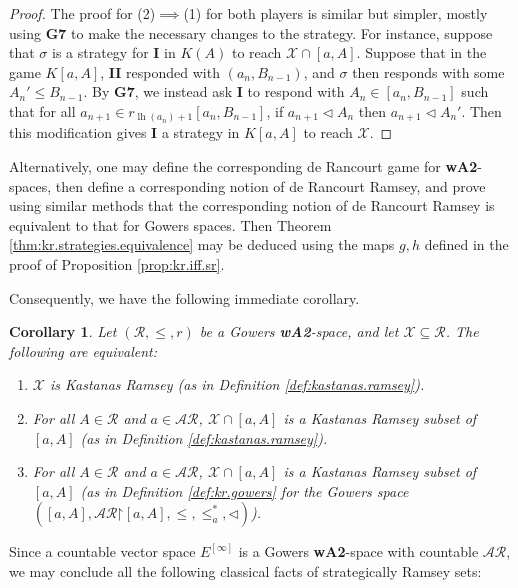 \documentclass[11pt,reqno]{amsart}
\theoremstyle{plain}
\numberwithin{equation}{section}
\newtheorem{corollary}[theorem]{Corollary}
\theoremstyle{definition}
\newcommand{\func}{\operatorname}
\newcommand{\cal}{\mathcal}
\newcommand{\restrictedto}{\mathord{\upharpoonright}}
\newcommand{\X}{\cal{X}}
\newcommand{\lh}{\func{lh}}
\begin{document}
\begin{proof}
     The proof for (2)$\implies$(1) for both players is similar but simpler, mostly using \textbf{G7} to make the necessary changes to the strategy. For instance, suppose that $\sigma$ is a strategy for \textbf{I} in $K(A)$ to reach $\X \cap [a,A]$. Suppose that in the game $K[a,A]$, \textbf{II} responded with $(a_n,B_{n-1})$, and $\sigma$ then responds with some $A_n' \leq B_{n-1}$. By \textbf{G7}, we instead ask \textbf{I} to respond with $A_n \in [a_n,B_{n-1}]$ such that for all $a_{n+1} \in r_{\lh(a_n)+1}[a_n,B_{n-1}]$, if $a_{n+1} \lhd A_n$ then $a_{n+1} \lhd A_n'$. Then this modification gives \textbf{I} a strategy in $K[a,A]$ to reach $\X$.
\end{proof}


Alternatively, one may define the corresponding de Rancourt game for \textbf{wA2}-spaces, then define a corresponding notion of de Rancourt Ramsey, and prove using similar methods that the corresponding notion of de Rancourt Ramsey is equivalent to that for Gowers spaces. Then Theorem \ref{thm:kr.strategies.equivalence} may be deduced using the maps $g,h$ defined in the proof of Proposition \ref{prop:kr.iff.sr}.

Consequently, we have the following immediate corollary.

\begin{corollary}
\label{cor:kr.equivalence}
    Let $(\cal{R},\leq,r)$ be a Gowers \textbf{wA2}-space, and let $\X \subseteq \cal{R}$. The following are equivalent:
    \begin{enumerate}
        \item $\X$ is Kastanas Ramsey (as in Definition \ref{def:kastanas.ramsey}).

        \item For all $A \in \cal{R}$ and $a \in \cal{AR}$, $\X \cap [a,A]$ is a Kastanas Ramsey subset of $[a,A]$ (as in Definition \ref{def:kastanas.ramsey}).

        \item For all $A \in \cal{R}$ and $a \in \cal{AR}$, $\X \cap [a,A]$ is a Kastanas Ramsey subset of $[a,A]$ (as in Definition \ref{def:kr.gowers} for the Gowers space $([a,A],\cal{AR}\restrictedto[a,A],\leq,\leq_a^*,\lhd)$).
    \end{enumerate}
\end{corollary}

Since a countable vector space $E^{[\infty]}$ is a Gowers \textbf{wA2}-space with countable $\cal{AR}$, we may conclude all the following classical facts of strategically Ramsey sets:
\end{document}

